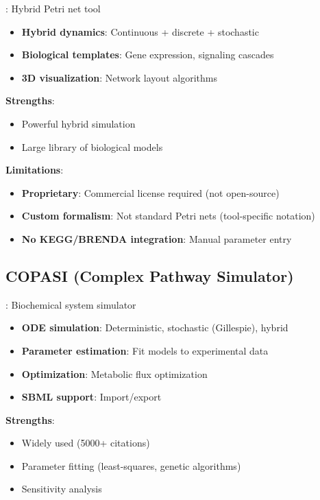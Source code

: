 \textbf{\citet{Nagasaki2010}}: Hybrid Petri net tool

\begin{itemize}
    \item \textbf{Hybrid dynamics}: Continuous + discrete + stochastic
    \item \textbf{Biological templates}: Gene expression, signaling cascades
    \item \textbf{3D visualization}: Network layout algorithms
\end{itemize}

\textbf{Strengths}:

\begin{itemize}
    \item Powerful hybrid simulation
    \item Large library of biological models
\end{itemize}

\textbf{Limitations}:

\begin{itemize}
    \item \textbf{Proprietary}: Commercial license required (not open-source)
    \item \textbf{Custom formalism}: Not standard Petri nets (tool-specific notation)
    \item \textbf{No KEGG/BRENDA integration}: Manual parameter entry
\end{itemize}

\subsection{COPASI (Complex Pathway Simulator)}
\label{subsec:copasi}

\textbf{\citet{Hoops2006}}: Biochemical system simulator

\begin{itemize}
    \item \textbf{ODE simulation}: Deterministic, stochastic (Gillespie), hybrid
    \item \textbf{Parameter estimation}: Fit models to experimental data
    \item \textbf{Optimization}: Metabolic flux optimization
    \item \textbf{SBML support}: Import/export
\end{itemize}

\textbf{Strengths}:

\begin{itemize}
    \item Widely used (5000+ citations)
    \item Parameter fitting (least-squares, genetic algorithms)
    \item Sensitivity analysis
\end{itemize}

